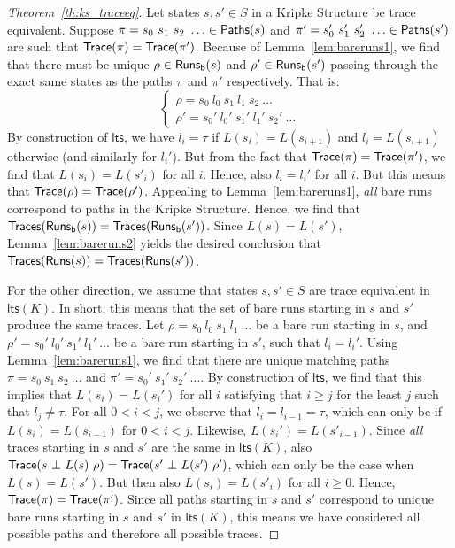\documentclass{llncs}
\newcommand{\lts}{\mathsf{lts}}
\begin{document}
\begin{proof}[Theorem~\ref{th:ks_traceeq}]
Let states $s,s' \in S$ in a Kripke Structure be trace equivalent.
Suppose $\pi = s_0\ s_1\ s_2\ \ldots \in \mathsf{Paths}(s)$ and $\pi' =
s_0'\ s_1'\ s_2'\ \ldots \in \mathsf{Paths}(s')$ are such that $\mathsf{Trace}(\pi) =
\mathsf{Trace}(\pi')$. Because of Lemma~\ref{lem:bareruns1}, we find that there
must be unique $\rho \in \mathsf{Runs_b}(s)$ and $\rho' \in \mathsf{Runs_b}(s')$
passing through the exact same states as the paths $\pi$ and $\pi'$
respectively. That is:
$$
\left \{
\begin{array}{ll}
\rho = s_0\ l_0\ s_1\ l_1\ s_2\ \ldots \\
\rho' = s_0'\ l_0'\ s_1'\ l_1'\ s_2'\ \ldots
\end{array}
\right .
$$
By construction of $\lts$, we have $l_i = \tau$ if
$L(s_i) = L(s_{i+1})$ and $l_i = L(s_{i+1})$ otherwise (and similarly for
$l_i'$). But from
the fact that $\mathsf{Trace}(\pi) = \mathsf{Trace}(\pi')$, we find that $L(s_i)
= L(s'_i)$ for all $i$. Hence, also $l_i = l_i'$ for all $i$. But
this means that $\mathsf{Trace}(\rho) = \mathsf{Trace}(\rho')$. Appealing to
Lemma~\ref{lem:bareruns1}, \emph{all} bare runs correspond to paths
in the Kripke Structure. Hence, we find that
$\mathsf{Traces}(\mathsf{Runs_b}(s)) = \mathsf{Traces}(\mathsf{Runs_b}(s'))$. Since $L(s) =
L(s')$, Lemma~\ref{lem:bareruns2} yields the desired conclusion that
$\mathsf{Traces}(\mathsf{Runs}(s)) = \mathsf{Traces}(\mathsf{Runs}(s'))$.

For the other direction, we assume that states $s,s' \in S$ are
trace equivalent in $\lts(K)$. In short, this means that the set of
bare runs starting in $s$ and $s'$ produce the same traces. Let
$\rho = s_0\ l_0\ s_1\ l_1\ \ldots$ be a bare run starting in $s$,
and $\rho' = s_0'\ l_0'\ s_1'\ l_1'\ \ldots$ be a bare run starting in
$s'$, such that $l_i = l_i'$. Using Lemma~\ref{lem:bareruns1}, we find
that there are unique matching paths $\pi = s_0\ s_1\ s_2\ \ldots$
and $\pi' = s_0'\ s_1'\ s_2'\ \ldots$.
By construction of $\lts$, we find that
this implies that $L(s_i) = L(s_i')$ for all $i$ satisfying that $i \ge j$
for the least $j$ such that $l_j \not= \tau$. For all $0 <i < j$, we
observe that $l_i = l_{i-1} = \tau$, which can only be if
$L(s_i) = L(s_{i-1})$ for $0 < i < j$. Likewise, $L(s_i') = L(s'_{i-1})$.
Since \emph{all} traces starting in $s$ and $s'$ are the same in
$\lts(K)$, also $\trace{s\ \bot\ L(s)\ \rho} = \trace{s'\ \bot\ L(s')\ \rho'}$,
which can only be the case when $L(s) = L(s')$. But then also
$L(s_i) = L(s'_i)$ for all $i \ge 0$. Hence, $\mathsf{Trace}(\pi) = \mathsf{Trace}(\pi')$.
Since all paths starting in
$s$ and $s'$ correspond to unique bare runs starting in $s$ and $s'$
in $\lts(K)$, this means we have considered all possible paths and
therefore all possible traces.
\end{proof}
\end{document}
